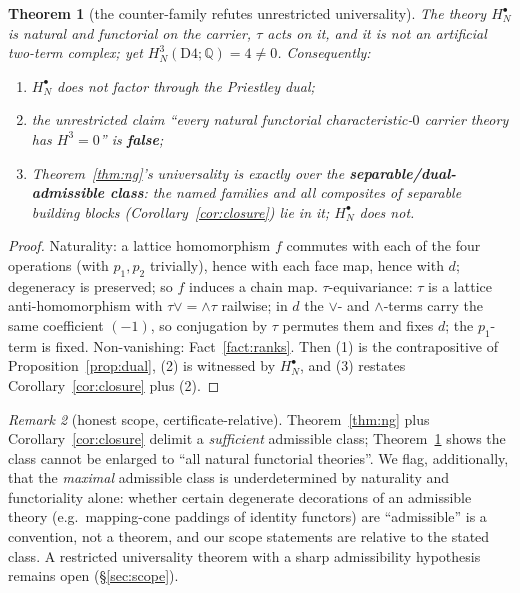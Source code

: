 \documentclass[11pt]{article}
\newtheorem{theorem}{Theorem}[section]
\theoremstyle{definition}
\theoremstyle{remark}
\newtheorem{remark}[theorem]{Remark}
\newcommand{\Q}{\mathbb{Q}}
\newcommand{\Dfour}{\mathrm{D4}}
\begin{document}
\begin{theorem}[the counter-family refutes unrestricted universality]\label{thm:counter}
The theory $H^\bullet_N$ is natural and functorial on the carrier, $\tau$ acts on it, and it is not an artificial two-term complex; yet $H^3_N(\Dfour;\Q)=4\ne0$. Consequently:
\begin{enumerate}
\item $H^\bullet_N$ does not factor through the Priestley dual;
\item the unrestricted claim ``every natural functorial characteristic-$0$ carrier theory has $H^3=0$'' is \textbf{false};
\item Theorem~\ref{thm:ng}'s universality is exactly over the \textbf{separable/dual-admissible class}: the named families and all composites of separable building blocks (Corollary~\ref{cor:closure}) lie in it; $H^\bullet_N$ does not.
\end{enumerate}
\end{theorem}

\begin{proof}
Naturality: a lattice homomorphism $f$ commutes with each of the four operations (with $p_1,p_2$ trivially), hence with each face map, hence with $d$; degeneracy is preserved; so $f$ induces a chain map. $\tau$-equivariance: $\tau$ is a lattice anti-homomorphism with $\tau\vee=\wedge\tau$ railwise; in $d$ the $\vee$- and $\wedge$-terms carry the same coefficient $(-1)$, so conjugation by $\tau$ permutes them and fixes $d$; the $p_1$-term is fixed. Non-vanishing: Fact~\ref{fact:ranks}. Then (1) is the contrapositive of Proposition~\ref{prop:dual}, (2) is witnessed by $H^\bullet_N$, and (3) restates Corollary~\ref{cor:closure} plus (2).
\end{proof}

\begin{remark}[honest scope, certificate-relative]\label{rem:honest}
Theorem~\ref{thm:ng} plus Corollary~\ref{cor:closure} delimit a \emph{sufficient} admissible class; Theorem~\ref{thm:counter} shows the class cannot be enlarged to ``all natural functorial theories''. We flag, additionally, that the \emph{maximal} admissible class is underdetermined by naturality and functoriality alone: whether certain degenerate decorations of an admissible theory (e.g.\ mapping-cone paddings of identity functors) are ``admissible'' is a convention, not a theorem, and our scope statements are relative to the stated class. A restricted universality theorem with a sharp admissibility hypothesis remains open (\S\ref{sec:scope}).
\end{remark}
\end{document}

